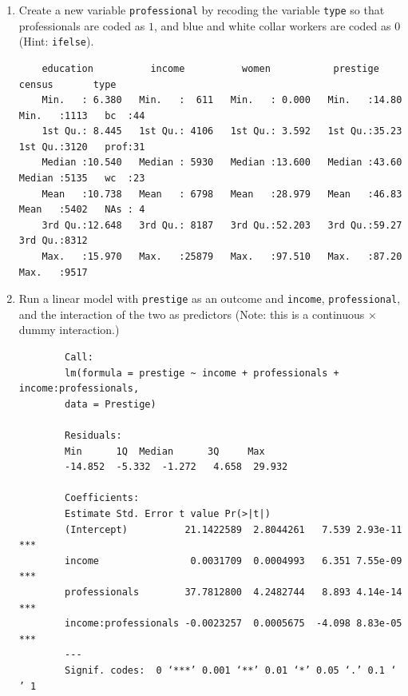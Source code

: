 \documentclass[12pt,letterpaper]{article}
\begin{document}
\newpage
\begin{enumerate}
	
	\item [(a)]
	Create a new variable \texttt{professional} by recoding the variable \texttt{type} so that professionals are coded as $1$, and blue and white collar workers are coded as $0$ (Hint: \texttt{ifelse}).
	
	\begin{doublespace}

	{\footnotesize
		\begin{verbatim}
	education          income          women           prestige         census       type   
	Min.   : 6.380   Min.   :  611   Min.   : 0.000   Min.   :14.80   Min.   :1113   bc  :44  
	1st Qu.: 8.445   1st Qu.: 4106   1st Qu.: 3.592   1st Qu.:35.23   1st Qu.:3120   prof:31  
	Median :10.540   Median : 5930   Median :13.600   Median :43.60   Median :5135   wc  :23  
	Mean   :10.738   Mean   : 6798   Mean   :28.979   Mean   :46.83   Mean   :5402   NAs : 4  
	3rd Qu.:12.648   3rd Qu.: 8187   3rd Qu.:52.203   3rd Qu.:59.27   3rd Qu.:8312            
	Max.   :15.970   Max.   :25879   Max.   :97.510   Max.   :87.20   Max.   :9517 
	\end{verbatim}}
	

	\end{doublespace}
	
	\newpage
	
	\item [(b)]
	Run a linear model with \texttt{prestige} as an outcome and \texttt{income}, \texttt{professional}, and the interaction of the two as predictors (Note: this is a continuous $\times$ dummy interaction.)
	
	\begin{doublespace}
	
	
	{\footnotesize
	\begin{verbatim}
		Call:
		lm(formula = prestige ~ income + professionals + income:professionals, 
		data = Prestige)
		
		Residuals:
		Min      1Q  Median      3Q     Max 
		-14.852  -5.332  -1.272   4.658  29.932 
		
		Coefficients:
		Estimate Std. Error t value Pr(>|t|)    
		(Intercept)          21.1422589  2.8044261   7.539 2.93e-11 ***
		income                0.0031709  0.0004993   6.351 7.55e-09 ***
		professionals        37.7812800  4.2482744   8.893 4.14e-14 ***
		income:professionals -0.0023257  0.0005675  -4.098 8.83e-05 ***
		---
		Signif. codes:  0 ‘***’ 0.001 ‘**’ 0.01 ‘*’ 0.05 ‘.’ 0.1 ‘ ’ 1
		

\end{verbatim}}
\end{doublespace}
\end{enumerate}
\end{document}
